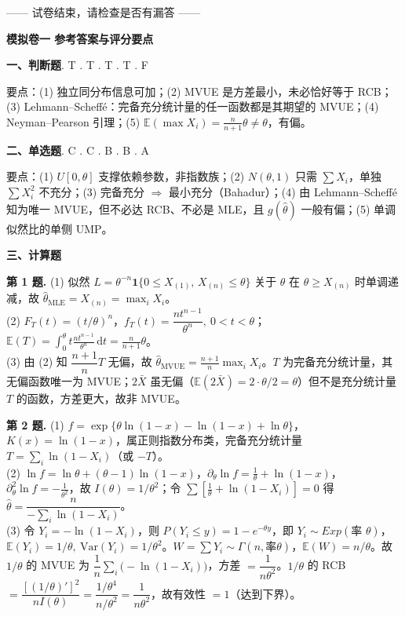 \documentclass[12pt,a4paper]{ctexart}
\newcommand{\E}{\mathbb{E}}
\newcommand{\Var}{\mathrm{Var}}
\newcommand{\dd}{\,\mathrm{d}}
\begin{document}
\vfill
\begin{center}\small —— 试卷结束，请检查是否有漏答 ——\end{center}

\newpage
\begin{center}{\Large\bfseries 模拟卷一 \quad 参考答案与评分要点}\end{center}

\noindent\textbf{一、判断题}. T . T . T . T . F\par
\smallskip
\noindent 要点：(1) 独立同分布信息可加；(2) MVUE 是方差最小，未必恰好等于 RCB；(3) Lehmann--Scheffé：完备充分统计量的任一函数都是其期望的 MVUE；(4) Neyman--Pearson 引理；(5) $\E(\max X_i)=\frac{n}{n+1}\theta\neq\theta$，有偏。

\medskip
\noindent\textbf{二、单选题}. C . C . B . B . A\par
\smallskip
\noindent 要点：(1) $U[0,\theta]$ 支撑依赖参数，非指数族；(2) $N(\theta,1)$ 只需 $\sum X_i$，单独 $\sum X_i^2$ 不充分；(3) 完备充分 $\Rightarrow$ 最小充分（Bahadur）；(4) 由 Lehmann--Scheffé 知为唯一 MVUE，但不必达 RCB、不必是 MLE，且 $g(\hat\theta)$ 一般有偏；(5) 单调似然比的单侧 UMP。

\medskip
\noindent\textbf{三、计算题}

\smallskip
\noindent\textbf{第 1 题.}\;
(1) 似然 $L=\theta^{-n}\mathbf 1\{0\le X_{(1)},\,X_{(n)}\le\theta\}$ 关于 $\theta$ 在 $\theta\ge X_{(n)}$ 时单调递减，故 $\hat\theta_{\text{MLE}}=X_{(n)}=\max_i X_i$。\\
(2) $F_T(t)=(t/\theta)^n$，$f_T(t)=\dfrac{n t^{n-1}}{\theta^n},\ 0<t<\theta$；$\E(T)=\displaystyle\int_0^\theta t\frac{nt^{n-1}}{\theta^n}\dd t=\frac{n}{n+1}\theta$。\\
(3) 由 (2) 知 $\dfrac{n+1}{n}T$ 无偏，故 $\boxed{\hat\theta_{\text{MVUE}}=\frac{n+1}{n}\max_i X_i}$。$T$ 为完备充分统计量，其无偏函数唯一为 MVUE；$2\bar X$ 虽无偏（$\E(2\bar X)=2\cdot\theta/2=\theta$）但不是充分统计量 $T$ 的函数，方差更大，故非 MVUE。

\smallskip
\noindent\textbf{第 2 题.}\;
(1) $f=\exp\{\theta\ln(1-x)-\ln(1-x)+\ln\theta\}$，$K(x)=\ln(1-x)$，属正则指数分布类，完备充分统计量 $T=\sum_i\ln(1-X_i)$（或 $-T$）。\\
(2) $\ln f=\ln\theta+(\theta-1)\ln(1-x)$，$\partial_\theta\ln f=\tfrac1\theta+\ln(1-x)$，$\partial^2_\theta\ln f=-\tfrac1{\theta^2}$，故 $I(\theta)=1/\theta^2$；令 $\sum[\tfrac1\theta+\ln(1-X_i)]=0$ 得 $\hat\theta=\dfrac{n}{-\sum_i\ln(1-X_i)}$。\\
(3) 令 $Y_i=-\ln(1-X_i)$，则 $P(Y_i\le y)=1-e^{-\theta y}$，即 $Y_i\sim Exp(\text{率 }\theta)$，$\E(Y_i)=1/\theta,\ \Var(Y_i)=1/\theta^2$。$W=\sum Y_i\sim\Gamma(n,\text{率}\theta)$，$\E(W)=n/\theta$。故 $1/\theta$ 的 MVUE 为 $\boxed{\dfrac{1}{n}\sum_i\big(-\ln(1-X_i)\big)}$，方差 $=\dfrac{1}{n\theta^2}$。$1/\theta$ 的 RCB $=\dfrac{[(1/\theta)']^2}{nI(\theta)}=\dfrac{1/\theta^4}{n/\theta^2}=\dfrac{1}{n\theta^2}$，故有效性 $=1$（达到下界）。
\end{document}
